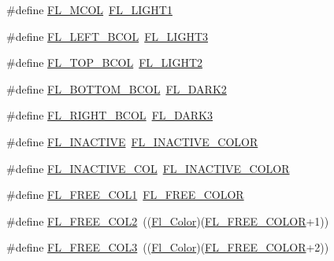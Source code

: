 \begin{DoxyCompactItemize}
\item 
\#define \hyperlink{forms_8_h_a358134ad495f1cbb5bcdf9328fe4fc5c}{F\+L\+\_\+\+M\+C\+OL}~\hyperlink{_enumerations_8_h_ab3a99b5be2f1cd0bd5d4b0bd723d1d31}{F\+L\+\_\+\+L\+I\+G\+H\+T1}
\item 
\#define \hyperlink{forms_8_h_a93ca777d49694a27f272c0d5a54e43a9}{F\+L\+\_\+\+L\+E\+F\+T\+\_\+\+B\+C\+OL}~\hyperlink{_enumerations_8_h_a1195306dc5887618e4ddea48c14da4ef}{F\+L\+\_\+\+L\+I\+G\+H\+T3}
\item 
\#define \hyperlink{forms_8_h_ad593b77ac8f957a6d5c9d424b3a53a2d}{F\+L\+\_\+\+T\+O\+P\+\_\+\+B\+C\+OL}~\hyperlink{_enumerations_8_h_a186273e1025db07389a99cf29ac81493}{F\+L\+\_\+\+L\+I\+G\+H\+T2}
\item 
\#define \hyperlink{forms_8_h_a03491484783fb79c488d5badc5355a33}{F\+L\+\_\+\+B\+O\+T\+T\+O\+M\+\_\+\+B\+C\+OL}~\hyperlink{_enumerations_8_h_ac11e9d182f35ff5fb029a0a28d12d919}{F\+L\+\_\+\+D\+A\+R\+K2}
\item 
\#define \hyperlink{forms_8_h_ae705c15b459faf42f326744c9eb5ca14}{F\+L\+\_\+\+R\+I\+G\+H\+T\+\_\+\+B\+C\+OL}~\hyperlink{_enumerations_8_h_ad723ee5e7504ff3c0f07dbe34e894b9f}{F\+L\+\_\+\+D\+A\+R\+K3}
\item 
\#define \hyperlink{forms_8_h_a4b6b4e561b6dd2597632f780e63a0901}{F\+L\+\_\+\+I\+N\+A\+C\+T\+I\+VE}~\hyperlink{_enumerations_8_h_a6501a998c459a5a117784f8c95a83a41}{F\+L\+\_\+\+I\+N\+A\+C\+T\+I\+V\+E\+\_\+\+C\+O\+L\+OR}
\item 
\#define \hyperlink{forms_8_h_a3fed43433734177e13ac84ce5bb9061f}{F\+L\+\_\+\+I\+N\+A\+C\+T\+I\+V\+E\+\_\+\+C\+OL}~\hyperlink{_enumerations_8_h_a6501a998c459a5a117784f8c95a83a41}{F\+L\+\_\+\+I\+N\+A\+C\+T\+I\+V\+E\+\_\+\+C\+O\+L\+OR}
\item 
\#define \hyperlink{forms_8_h_a571a36da7f3b85d0e56220d3141c3675}{F\+L\+\_\+\+F\+R\+E\+E\+\_\+\+C\+O\+L1}~\hyperlink{_enumerations_8_h_aa8fe2e5047a2dd1be37e8336dfca918d}{F\+L\+\_\+\+F\+R\+E\+E\+\_\+\+C\+O\+L\+OR}
\item 
\#define \hyperlink{forms_8_h_a2e36a4851beacb256da00b734d66d53c}{F\+L\+\_\+\+F\+R\+E\+E\+\_\+\+C\+O\+L2}~((\hyperlink{_enumerations_8_h_a8b762953646f8abee866061f1af78a6a}{Fl\+\_\+\+Color})(\hyperlink{_enumerations_8_h_aa8fe2e5047a2dd1be37e8336dfca918d}{F\+L\+\_\+\+F\+R\+E\+E\+\_\+\+C\+O\+L\+OR}+1))
\item 
\#define \hyperlink{forms_8_h_ab29a79a3f7a65fc5fac6f12a97b6d9a0}{F\+L\+\_\+\+F\+R\+E\+E\+\_\+\+C\+O\+L3}~((\hyperlink{_enumerations_8_h_a8b762953646f8abee866061f1af78a6a}{Fl\+\_\+\+Color})(\hyperlink{_enumerations_8_h_aa8fe2e5047a2dd1be37e8336dfca918d}{F\+L\+\_\+\+F\+R\+E\+E\+\_\+\+C\+O\+L\+OR}+2))

\end{DoxyCompactItemize}
